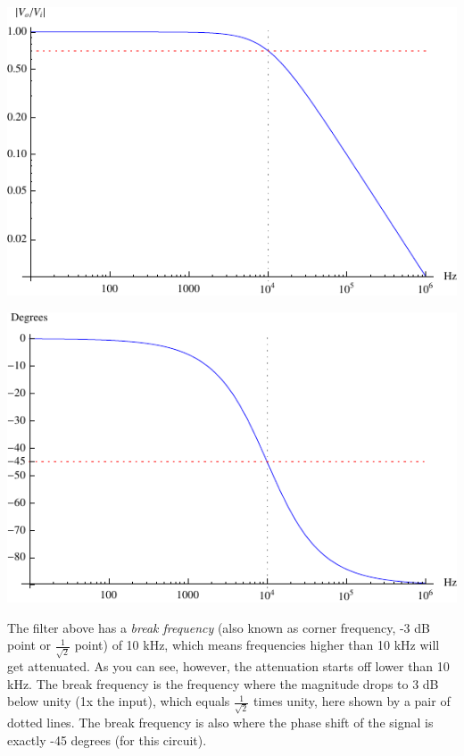 \documentclass[12pt,a4paper]{report}
\begin{document}
\includegraphics[scale=1.75]{Graphics/lpf_magnitude_plot}

\includegraphics[scale=1.75]{Graphics/lpf_phase_plot}

The filter above has a \emph{break frequency} (also known as corner frequency, -3 dB point or $\displaystyle \frac{1}{\sqrt{2}}$ point) of 10 kHz, which means frequencies higher than 10 kHz will get attenuated. As you can see, however, the attenuation starts off lower than 10 kHz. The break frequency is the frequency where the magnitude drops to 3 dB below unity (1x the input), which equals $\displaystyle \frac{1}{\sqrt{2}}$ times unity, here shown by a pair of dotted lines. The break frequency is also where the phase shift of the signal is exactly -45 degrees (for this circuit).\\
\end{document}
